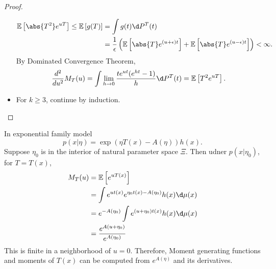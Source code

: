 \documentclass[a4paper]{article}
\begin{document}
\begin{proof}
\begin{itemize}
		\begin{equation*}
			\begin{aligned}
				\mathbb{E}\left[\abs{T^2}e^{uT}\right] \leq \mathbb{E}\left[g(T)\right]
				&= \int g(t) \d P^T(t) \\
				&= \frac{1}{\epsilon}\left(\mathbb{E}\left[\abs{T}e^{(u+\epsilon) t}\right]+\mathbb{E}\left[\abs{T}e^{(u-\epsilon) t}\right]\right) < \infty.
			\end{aligned}
		\end{equation*}
		By Dominated Convergence Theorem,
		\begin{equation*}
			\frac{d^2}{du^2}M_T(u) = \int \lim\limits_{h \to 0} \frac{t e^{ut}(e^{ht}-1)}{h}\d P^T(t) = \mathbb{E}\left[T^2 e^{uT}\right].
		\end{equation*} 
		\item For $k \geq 3$, continue by induction.
	\end{itemize}
\end{proof}

\begin{remark}
	In exponential family model
	\begin{equation}
		p(x|\eta) = \exp(\eta T(x)-A(\eta))h(x).
	\end{equation}
	Suppose $\eta_0$ is in the interior of natural parameter space $\Xi$. Then udner $p(x|\eta_0)$, for $T = T(x)$, 
	\begin{equation}
		\begin{aligned}
			M_T(u) &= \mathbb{E}\left[e^{uT(x)}\right] \\
			&= \int e^{ut(x)} e^{\eta_0 t(x) - A(\eta_0)}h(x) \d \mu (x) \\
			&= e^{-A(\eta_0)}\int e^{(u+\eta_0)t(x)}h(x) \d \mu (x) \\
			&= \frac{e^{A(u + \eta_0)}}{e^{A(\eta_0)}}
		\end{aligned}
	\end{equation}
	This is finite in a neighborhood of $u = 0$.
	Therefore, Moment generating functions and moments of $T(x)$ can be computed from $e^{A(\eta)}$ and its derivatives.
\end{remark}
\end{document}
